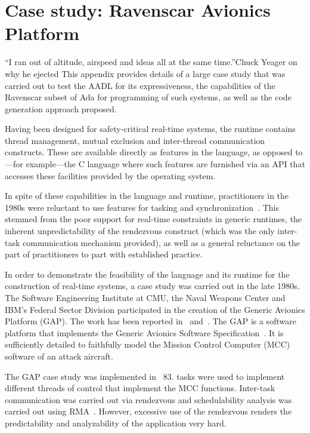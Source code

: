 \chapter{Case study: Ravenscar Avionics Platform}{``I ran out of
  altitude, airspeed and ideas all at the same time.''}{Chuck Yeager
    on why he ejected}
\label{chap:rap}
This appendix provides details of a large case study that was carried
out to test the AADL for its expressiveness, the capabilities of the
Ravenscar subset of Ada for programming of such systems, as well as
the code generation approach proposed.

Having been designed for safety-critical real-time systems, the \ada
runtime contains thread management, mutual exclusion and inter-thread
communication constructs. These are available directly as features in
the language, as opposed to---for example---the C language where such
features are furnished via an API that accesses these facilities
provided by the operating system.

In spite of these capabilities in the language and runtime,
practitioners in the 1980s were reluctant to use  features for
tasking and synchronization~\cite{cornhill@irtaw87}. This stemmed from
the poor support for real-time constraints in generic 
runtimes, the inherent unpredictability of the rendezvous construct
(which was the only inter-task communication mechanism provided), as
well as a general reluctance on the part of practitioners to part with
established practice.

In order to demonstrate the feasibility of the \ada language and its
runtime for the construction of real-time systems, a case study was
carried out in the late 1980s. The Software Engineering Institute at
CMU, the Naval Weapons Center and IBM's Federal Sector Division
participated in the creation of the Generic Avionics Platform
(GAP). The work has been reported in~\cite{locke@rtss91}
and~\cite{locke@irtaw90}. The GAP is a software platform that
implements the Generic Avionics Software
Specification~\cite{locke@sei90}. It is sufficiently detailed to
faithfully model the Mission Control Computer (MCC) software of an
attack aircraft.

The GAP case study was implemented in \ada~83. \ada tasks were used to
implement different threads of control that implement the MCC
functions. Inter-task communication was carried out via rendezvous and
schedulability analysis was carried out using
RMA~\cite{liu@jacm73,liu@jacm73}. However, excessive use of the \ada
rendezvous renders the predictability and analyzability of the
application very hard.

